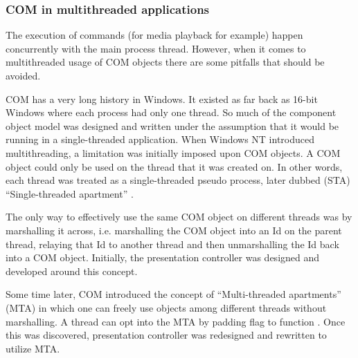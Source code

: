 \documentclass[12pt, fleqn, a4paper]{article}
\begin{document}
\subsubsection{COM in multithreaded applications}
The execution of commands (for media playback for example) happen concurrently with the main process thread. However, when it comes to multithreaded usage of COM objects there are some pitfalls that should be avoided.\par
COM has a very long history in Windows. It existed as far back as 16-bit Windows where each process had only one thread. So much of the component object model was designed and written under the assumption that it would be running in a single-threaded application. When Windows NT introduced multithreading, a limitation was initially imposed upon COM objects. A COM object could only be used on the thread that it was created on. In other words, each thread was treated as a single-threaded pseudo process, later dubbed (STA) \enquote{Single-threaded apartment} \citep{chen_2019}.\par
The only way to effectively use the same COM object on different threads was by marshalling it across, i.e. marshalling the COM object into an Id on the parent thread, relaying that Id to another thread and then unmarshalling the Id back into a COM object. Initially, the presentation controller was designed and developed around this concept.\par
Some time later, COM introduced the concept of \enquote{Multi-threaded apartments} (MTA) in which one can freely use objects among different threads without marshalling. A thread can opt into the MTA by padding  flag to function  \citep{pywin32}. Once this was discovered, presentation controller was redesigned and rewritten to utilize MTA.
\end{document}
